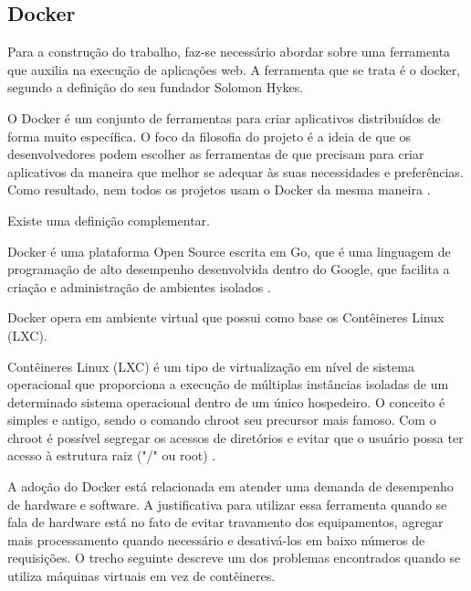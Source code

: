 \subsection{Docker}\label{docker}

Para a construção do trabalho, faz-se necessário abordar sobre uma ferramenta que auxilia na execução de aplicações web.
A ferramenta que se trata é o docker, segundo a definição do seu fundador Solomon Hykes.

\begin{citacao}
O Docker é um conjunto de ferramentas para criar aplicativos distribuídos de forma muito específica. O foco da filosofia
do projeto é a ideia de que os desenvolvedores podem escolher as ferramentas de que precisam para criar aplicativos da
maneira que melhor se adequar às suas necessidades e preferências. Como resultado, nem todos os projetos usam o Docker
da mesma maneira \cite{solomon-hykes}.
\end{citacao}

Existe uma definição complementar.

\begin{citacao}
Docker é uma plataforma Open Source escrita em Go, que é uma linguagem de
programação de alto desempenho desenvolvida dentro do Google, que facilita a criação e administração de ambientes isolados
\cite{mundodocker-01}.
\end{citacao}

Docker opera em ambiente virtual que possui como base os Contêineres Linux (LXC).
\begin{citacao}
Contêineres Linux (LXC) é um tipo de
virtualização em nível de sistema operacional que proporciona a execução de múltiplas instâncias isoladas de um determinado
sistema operacional dentro de um único hospedeiro. O conceito é simples e antigo, sendo o comando chroot seu precursor mais
famoso. Com o chroot é possível segregar os acessos de diretórios e evitar que o usuário possa ter acesso à estrutura raiz
("/" ou root) \cite{sinestec-01}.
\end{citacao}


A adoção do Docker está relacionada em atender uma demanda de desempenho de hardware e software. A justificativa para utilizar
essa ferramenta quando se fala de hardware está no fato de evitar travamento dos equipamentos, agregar mais processamento
quando necessário e desativá-los em baixo números de requisições.
O trecho seguinte descreve um dos problemas encontrados quando se utiliza máquinas virtuais em vez de contêineres.

